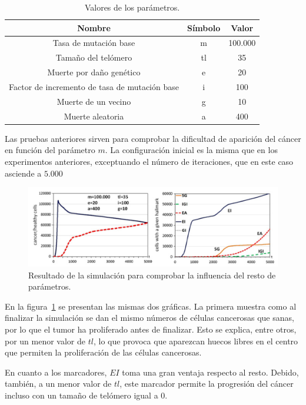 \begin{table}[h!]
  \centering
  \caption{Valores de los parámetros.}
  \label{tab:table1}
  \begin{tabular}{ccc}
    \toprule
    Nombre & Símbolo & Valor\\
    \midrule
    Tasa de mutación base & m & 100.000\\
    Tamaño del telómero & tl & 35\\
    Muerte por daño genético & e & 20\\
    Factor de incremento de tasa de mutación base & i & 100\\
    Muerte de un vecino & g & 10\\
    Muerte aleatoria & a & 400\\
    \bottomrule
  \end{tabular}
\end{table}

Las pruebas anteriores sirven para comprobar la dificultad de aparición del cáncer en
función del parámetro $m$. La configuración inicial es la misma que en los experimentos
anteriores, exceptuando el número de iteraciones, que en este caso asciende a $5.000$

\begin{figure}[h]
\centering
\includegraphics[scale=0.8]{figures/experiments/exp4}
\caption{Resultado de la simulación para comprobar la influencia del resto de parámetros.}
\label{fig:exp4}
\end{figure}

En la figura~\ref{fig:exp4} se presentan las mismas dos gráficas. La primera muestra como
al finalizar la simulación se dan el mismo números de células cancerosas que sanas, por
lo que el tumor ha proliferado antes de finalizar. Esto se explica, entre otros, por
un menor valor de $tl$, lo que provoca que aparezcan huecos libres en el centro que
permiten la proliferación de las células cancerosas.

En cuanto a los marcadores, $EI$ toma una gran ventaja respecto al resto. Debido, también,
a un menor valor de $tl$, este marcador permite la progresión del cáncer incluso con un tamaño de telómero igual a $0$.

